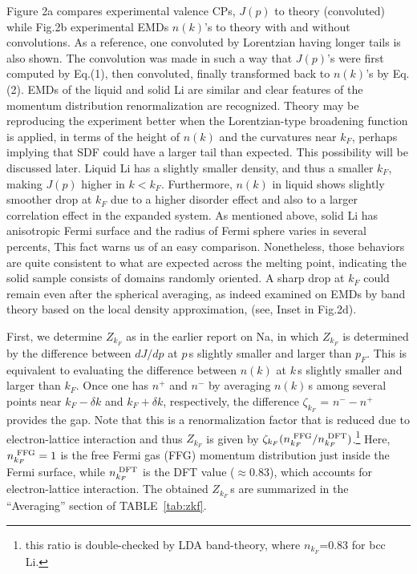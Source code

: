 \documentclass[twocolumn,showpacs,showkeys,fleqn,prl,superscriptaddress]{revtex4}%
\newcommand{\nn}[1]{\textnormal{ #1}}
\begin{document}
\vspace{10mm}

Figure 2a compares experimental valence CPs, $J(p)$ to theory (convoluted) while Fig.2b experimental EMDs $n(k)$’s to theory with and without convolutions. 
As a reference, one convoluted by Lorentzian having longer tails is also shown. 
The convolution was made in such a way that $J(p)$’s were first computed by Eq.(1), then convoluted, finally transformed back to $n(k)$’s by Eq. (2). 
EMDs of the liquid and solid Li are similar and clear features of the momentum distribution renormalization are recognized.  
Theory may be reproducing the experiment better when the Lorentzian-type broadening function is applied, in terms of the height of $n(k)$ and the curvatures near $k_F$, perhaps implying that SDF could have a larger tail than expected.
This possibility will be discussed later. 
Liquid Li has a slightly smaller density, and thus a smaller $k_F$, making $J(p)$ higher in $k < k_F$.
Furthermore, $n(k)$ in liquid shows slightly smoother drop at $ k_F $ due to a higher disorder effect and also to a larger correlation effect in the expanded system.
As mentioned above, solid Li has anisotropic Fermi surface and the radius of Fermi sphere varies in several percents\cite{saku95,schulke96}, This fact warns us of an easy comparison.
Nonetheless, those behaviors are quite consistent to what are expected across the melting point, indicating the solid sample consists of domains randomly oriented. 
A sharp drop at $k_F$ could remain even after the spherical averaging, as indeed examined on EMDs by band theory based on the local density approximation, (see, Inset in Fig.2d). 


First, we determine $Z_{k_F}$ as in the earlier report on Na\cite{simo10}, in which $Z_{k_F}$ is determined by the difference between $dJ/dp$ at $p\,$s slightly smaller and larger than $p_F$. 
This is equivalent to evaluating the difference between $n(k)$ at $k\,$s slightly smaller and larger than $k_F$.
Once one has $n^+$ and $n^-$ by averaging $n(k)$\,s among several points near $k_F-\delta k$ and  $k_F+\delta k$, respectively, the difference $\zeta_{k_F}$ = $n^- - n^+$ provides the gap. 
Note that this is a renormalization factor that is reduced due to electron-lattice interaction and thus 
$Z_{k_F}$ is given by $\zeta_{k_F} (n_{k_F}^{\nn{FFG}}/n_{k_F}^{\nn{DFT}})$.\footnote{this ratio is double-checked by LDA band-theory, where $n_{k_F}$=0.83 for bcc Li.}
Here, $n_{k_F}^{\nn{FFG}}=1$ is the free Fermi gas (FFG) momentum distribution just inside the Fermi surface, while $n_{k_F}^{\nn{DFT}}$ is the DFT value ($\approx$0.83), which accounts for electron-lattice interaction. 
The obtained $Z_{k_F}\,$s are summarized in the ``Averaging'' section of TABLE~\ref{tab:zkf}.
\end{document}
